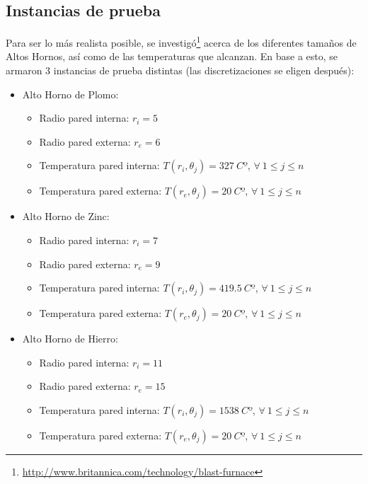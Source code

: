 \newcommand{\imagenB}[2]{%
\texttt{[image: \#2]}
\endgroup}

\def\imagen{\begingroup
\catcode`\_=12
\imagenB}
\subsection{Instancias de prueba}\label{instancias}

Para ser lo más realista posible, se investigó\footnote{\url{http://www.britannica.com/technology/blast-furnace}} acerca de los diferentes tamaños de Altos Hornos, así como de las temperaturas que alcanzan.
En base a esto, se armaron 3 instancias de prueba distintas (las discretizaciones se eligen después):
\begin{itemize}
    \item Alto Horno de Plomo:
        \begin{itemize}
            \item Radio pared interna: $r_i = 5$
            \item Radio pared externa: $r_e = 6$
            \item Temperatura pared interna: $T(r_i, \theta_j) = 327\ Cº$, $\forall\ 1 \leq j \leq n$
            \item Temperatura pared externa: $T(r_e, \theta_j) = 20\ Cº$, $\forall\ 1 \leq j \leq n$
        \end{itemize}
    \item Alto Horno de Zinc:
        \begin{itemize}
            \item Radio pared interna: $r_i = 7$
            \item Radio pared externa: $r_e = 9$
            \item Temperatura pared interna: $T(r_i, \theta_j) = 419.5\ Cº$, $\forall\ 1 \leq j \leq n$
            \item Temperatura pared externa: $T(r_e, \theta_j) = 20\ Cº$, $\forall\ 1 \leq j \leq n$
        \end{itemize}
    \item Alto Horno de Hierro:
        \begin{itemize}
            \item Radio pared interna: $r_i = 11$
            \item Radio pared externa: $r_e = 15$
            \item Temperatura pared interna: $T(r_i, \theta_j) = 1538\ Cº$, $\forall\ 1 \leq j \leq n$
            \item Temperatura pared externa: $T(r_e, \theta_j) = 20\ Cº$, $\forall\ 1 \leq j \leq n$
        \end{itemize}
\end{itemize}

